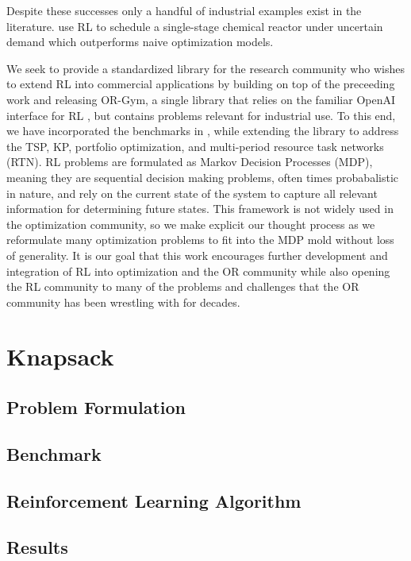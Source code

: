\documentclass[12pt]{article}
\begin{document}
Despite these successes only a handful of industrial examples exist in the literature. 
\citet{Hubbs2020} use RL to schedule a single-stage chemical reactor under uncertain demand which outperforms naive optimization models. 

We seek to provide a standardized library for the research community who wishes to extend RL into commercial applications by building on top of the preceeding work and releasing OR-Gym, a single library that relies on the familiar OpenAI interface for RL \citep{Brockman2016}, but contains problems relevant for industrial use.
To this end, we have incorporated the benchmarks in \citet{Balaji2019}, while extending the library to address the TSP, KP, portfolio optimization, and multi-period resource task networks (RTN). 
RL problems are formulated as Markov Decision Processes (MDP), meaning they are sequential decision making problems, often times probabalistic in nature, and rely on the current state of the system to capture all relevant information for determining future states. %
This framework is not widely used in the optimization community, so we make explicit our thought process as we reformulate many optimization problems to fit into the MDP mold without loss of generality.
It is our goal that this work encourages further development and integration of RL into optimization and the OR community while also opening the RL community to many of the problems and challenges that the OR community has been wrestling with for decades.

\section{Knapsack}

\subsection{Problem Formulation}

\subsection{Benchmark}

\subsection{Reinforcement Learning Algorithm}

\subsection{Results}
\end{document}
